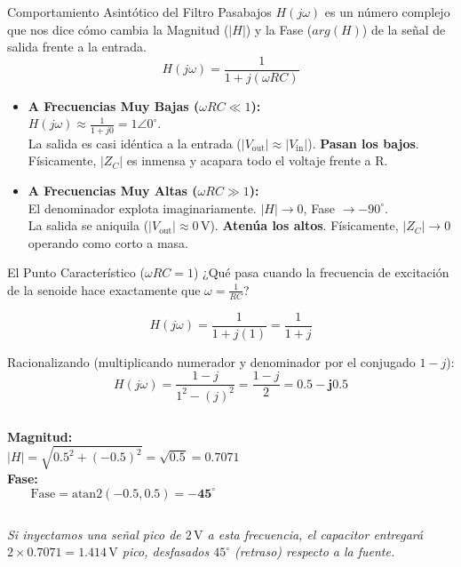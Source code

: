 \documentclass[aspectratio=169, 10pt]{beamer}
\begin{document}
\begin{frame}{Comportamiento Asintótico del Filtro Pasabajos}
    $H(j\omega)$ es un número complejo que nos dice cómo cambia la Magnitud ($|H|$) y la Fase ($arg(H)$) de la señal de salida frente a la entrada. \\
    $$ H(j\omega) = \frac{1}{1 + j(\omega RC)} $$
    \vspace{0.1cm}
    \begin{itemize}\setlength\itemsep{0.2cm}
        \item \textbf{A Frecuencias Muy Bajas ($\omega RC \ll 1$):} \\
        $H(j\omega) \approx \frac{1}{1 + j0} = 1\angle 0^\circ$. \\
        La salida es casi idéntica a la entrada ($|V_{\text{out}}| \approx |V_{\text{in}}|$). \textbf{Pasan los bajos}. Físicamente, $|Z_C|$ es inmensa y acapara todo el voltaje frente a R.
        
        \item \textbf{A Frecuencias Muy Altas ($\omega RC \gg 1$):} \\
        El denominador explota imaginariamente. $|H| \to 0$, Fase $\to -90^\circ$. \\
        La salida se aniquila ($|V_{\text{out}}| \approx 0\,\text{V}$). \textbf{Atenúa los altos}. Físicamente, $|Z_C| \to 0$ operando como corto a masa.
    \end{itemize}
\end{frame}

\begin{frame}{El Punto Característico ($\omega RC = 1$)}
    ¿Qué pasa cuando la frecuencia de excitación de la senoide hace exactamente que $\omega = \frac{1}{RC}$? 
    \vspace{0.2cm}
    
    $$ H(j\omega) = \frac{1}{1 + j(1)} = \frac{1}{1 + j} $$
    
    Racionalizando (multiplicando numerador y denominador por el conjugado $1-j$):
    $$ H(j\omega) = \frac{1-j}{1^2 - (j)^2} = \frac{1-j}{2} = \mathbf{0.5 - j0.5} $$
    
    \begin{columns}
        \textbf{Magnitud:} 
        $$ |H| = \sqrt{0.5^2 + (-0.5)^2} = \sqrt{0.5} = \mathbf{0.7071} $$
        \textbf{Fase:}
        $$ \text{Fase} = \text{atan2}(-0.5, 0.5) = \mathbf{-45^\circ} $$
    \end{columns}
    
    \vspace{0.3cm}
    \textit{Si inyectamos una señal pico de $2\,\text{V}$ a esta frecuencia, el capacitor entregará $2 \times 0.7071 = 1.414\,\text{V}$ pico, desfasados $45^\circ$ (retraso) respecto a la fuente.}
\end{frame}
\end{document}
